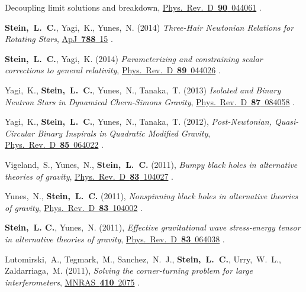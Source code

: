 \begin{etaremune}[start=\value{pubCounter}]
{    Decoupling limit solutions and breakdown},
  \href{http://dx.doi.org/10.1103/PhysRevD.90.044061}{Phys.~Rev.~D~{\bf 90}~044061}
  .
\item
  {\bf Stein,~L.~C.}, Yagi,~K., Yunes,~N.
  (2014)
  {\it Three-Hair Newtonian Relations for Rotating Stars},
  \href{http://dx.doi.org/10.1088/0004-637X/788/1/15}{ApJ~{\bf 788}~15}
  .
\item
  {\bf Stein,~L.~C.}, Yagi,~K.
  (2014)
  {\it Parameterizing and constraining scalar corrections to general relativity},
  \href{http://dx.doi.org/10.1103/PhysRevD.89.044026}{Phys.~Rev.~D~{\bf 89}~044026}
  .
\item
  Yagi,~K., {\bf Stein,~L.~C.}, Yunes,~N., Tanaka,~T.
  (2013)
  {\it Isolated and Binary Neutron Stars in Dynamical Chern-Simons Gravity},
  \href{http://dx.doi.org/10.1103/PhysRevD.87.084058}{Phys.~Rev.~D~{\bf 87}~084058}
  .
\item
  Yagi,~K., {\bf Stein,~L.~C.}, Yunes,~N., Tanaka,~T.
  (2012),
  {\it Post-Newtonian, Quasi-Circular Binary Inspirals in Quadratic Modified Gravity},
  \href{http://dx.doi.org/10.1103/PhysRevD.85.064022}{Phys.~Rev.~D~{\bf 85}~064022}
  .
\item
  Vigeland,~S., Yunes,~N., {\bf Stein,~L.~C.}
  (2011),
  {\it Bumpy black holes in alternative theories of gravity},
  \href{http://dx.doi.org/10.1103/PhysRevD.83.104027}{Phys.~Rev.~D~{\bf 83}~104027}
  .
\item
  Yunes,~N., {\bf Stein,~L.~C.}
  (2011),
  {\it Nonspinning black holes in alternative theories of gravity},
  \href{http://dx.doi.org/10.1103/PhysRevD.83.104002}{Phys.~Rev.~D~{\bf 83}~104002}
  .
\item
  {\bf Stein,~L. C.}, Yunes,~N.
  (2011),
  {\it Effective gravitational wave stress-energy tensor in
    alternative theories of gravity},
  \href{http://dx.doi.org/10.1103/PhysRevD.83.064038}{Phys.~Rev.~D~{\bf 83}~064038}
  .
\item
  Lutomirski,~A., Tegmark,~M., Sanchez,~N.~J., {\bf
    Stein,~L.~C.}, Urry,~W.~L., Zaldarriaga,~M.
  (2011),
  {\it Solving the corner-turning problem for large interferometers},
  \href{http://dx.doi.org/10.1111/j.1365-2966.2010.17587.x}{MNRAS~{\bf 410}~2075}
  .
\item

\end{etaremune}
